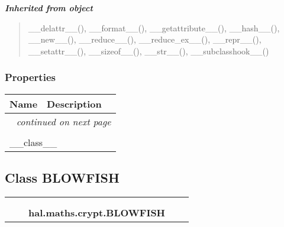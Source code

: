 \large{\textbf{\textit{Inherited from object}}}

\begin{quote}
\_\_delattr\_\_(), \_\_format\_\_(), \_\_getattribute\_\_(), \_\_hash\_\_(), \_\_new\_\_(), \_\_reduce\_\_(), \_\_reduce\_ex\_\_(), \_\_repr\_\_(), \_\_setattr\_\_(), \_\_sizeof\_\_(), \_\_str\_\_(), \_\_subclasshook\_\_()
\end{quote}


  \subsubsection{Properties}

    \vspace{-1cm}
\hspace{\varindent}\begin{longtable}{|p{\varnamewidth}|p{\vardescrwidth}|l}
\cline{1-2}
\cline{1-2} \centering \textbf{Name} & \centering \textbf{Description}& \\
\cline{1-2}
\endhead\cline{1-2}\multicolumn{3}{r}{\small\textit{continued on next page}}\\\endfoot\cline{1-2}
\endlastfoot\multicolumn{2}{|l|}{\textit{Inherited from object}}\\
\multicolumn{2}{|p{\varwidth}|}{\raggedright \_\_class\_\_}\\
\cline{1-2}
\end{longtable}



\subsection{Class BLOWFISH}

    \label{hal:maths:crypt:BLOWFISH}
\begin{tabular}{cccccc}
\multicolumn{2}{r}{\settowidth{\BCL}{object}\multirow{2}{\BCL}{object}}
&&
  \\\cline{3-3}
  &&\multicolumn{1}{c|}{}
&&
  \\
&&\multicolumn{2}{l}{\textbf{hal.maths.crypt.BLOWFISH}}
\end{tabular}

